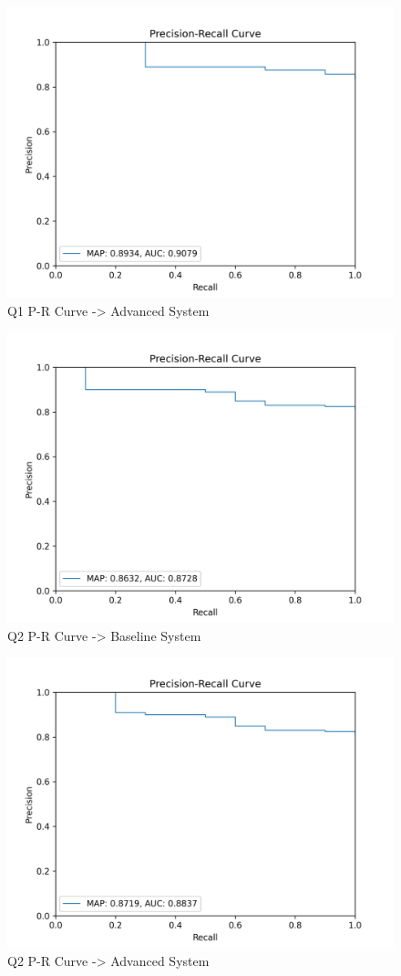 \documentclass[sigconf]{acmart}
\begin{document}
\begin{figure}[H]
  \centering
  \includegraphics[width=0.8\linewidth]{precision_recall_q1a.png}
  \caption{Q1 P-R Curve -> Advanced System}
  \label{fig:precisionRecallAdvanced1}
\end{figure}

\begin{figure}[H]
  \centering
  \includegraphics[width=0.8\linewidth]{precision_recall_q2b.png}
  \caption{Q2 P-R Curve -> Baseline System}
  \label{fig:precisionRecallBaseline2}
\end{figure}

\begin{figure}[H]
  \centering
  \includegraphics[width=0.8\linewidth]{precision_recall_q2a.png}
  \caption{Q2 P-R Curve -> Advanced System}
  \label{fig:precisionRecallAdvanced2}
\end{figure}
\end{document}
